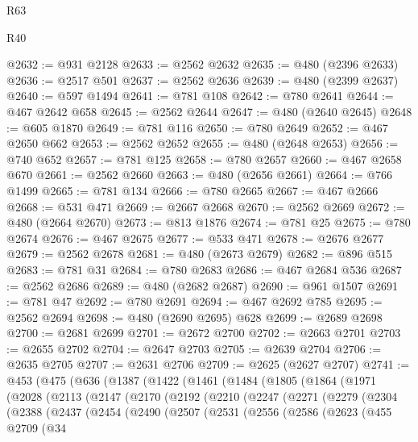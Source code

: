 \begin{lexlean}{R63}
\begin{lexlean}{R40}
\begin{coremodule}
{{{{{{{{{{{{{{{{{{{{{{{{{{{{{{{{{{{{{{{{{{{{{{{{{{{{{{{{{{{{{{{{{{{{{{{{{{{{{{{{{{{{{{{{{{{{{{{{{{{{{{{{{{{{{@2632 := @931 @2128
@2633 := @2562 @2632
@2635 := @480 (@2396 @2633)
@2636 := @2517 @501
@2637 := @2562 @2636
@2639 := @480 (@2399 @2637)
@2640 := @597 @1494
@2641 := @781 @108
@2642 := @780 @2641
@2644 := @467 @2642 @658
@2645 := @2562 @2644
@2647 := @480 (@2640 @2645)
@2648 := @605 @1870
@2649 := @781 @116
@2650 := @780 @2649
@2652 := @467 @2650 @662
@2653 := @2562 @2652
@2655 := @480 (@2648 @2653)
@2656 := @740 @652
@2657 := @781 @125
@2658 := @780 @2657
@2660 := @467 @2658 @670
@2661 := @2562 @2660
@2663 := @480 (@2656 @2661)
@2664 := @766 @1499
@2665 := @781 @134
@2666 := @780 @2665
@2667 := @467 @2666
@2668 := @531 @471
@2669 := @2667 @2668
@2670 := @2562 @2669
@2672 := @480 (@2664 @2670)
@2673 := @813 @1876
@2674 := @781 @25
@2675 := @780 @2674
@2676 := @467 @2675
@2677 := @533 @471
@2678 := @2676 @2677
@2679 := @2562 @2678
@2681 := @480 (@2673 @2679)
@2682 := @896 @515
@2683 := @781 @31
@2684 := @780 @2683
@2686 := @467 @2684 @536
@2687 := @2562 @2686
@2689 := @480 (@2682 @2687)
@2690 := @961 @1507
@2691 := @781 @47
@2692 := @780 @2691
@2694 := @467 @2692 @785
@2695 := @2562 @2694
@2698 := @480 (@2690 @2695) @628
@2699 := @2689 @2698
@2700 := @2681 @2699
@2701 := @2672 @2700
@2702 := @2663 @2701
@2703 := @2655 @2702
@2704 := @2647 @2703
@2705 := @2639 @2704
@2706 := @2635 @2705
@2707 := @2631 @2706
@2709 := @2625 (@2627 @2707)
@2741 := @453
    (@475
      (@636
        (@1387
          (@1422
            (@1461
              (@1484
                (@1805
                  (@1864
                    (@1971
                      (@2028
                        (@2113
                          (@2147
                            (@2170
                              (@2192
                                (@2210
                                  (@2247
                                    (@2271
                                      (@2279
                                        (@2304
                                          (@2388
                                            (@2437
                                              (@2454
                                                (@2490
                                                  (@2507
                                                    (@2531
                                                      (@2556
                                                        (@2586
                                                          (@2623
                                                            (@455
                                                              @2709
                                                              (@34
}}}}}}}}}}}}}}}}}}}}}}}}}}}}}}}}}}}}}}}}}}}}}}}}}}}}}}}}}}}}}}}}}}}}}}}}}}}}}}}}}}}}}}}}}}}}}}}}}}}}}}}}}}}}}
\end{coremodule}
\end{lexlean}
\end{lexlean}
